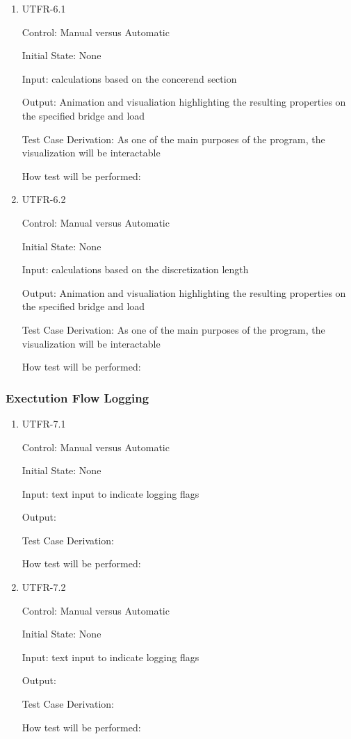 \documentclass[12pt, titlepage]{article}
\begin{document}
\begin{enumerate}

\item{UTFR-6.1\\}

Control: Manual versus Automatic
					
Initial State: None
					
Input: calculations based on the concerend section 
					
Output: Animation and visualiation highlighting the resulting properties on the specified bridge and load 

Test Case Derivation: As one of the main purposes of the program, the visualization will be interactable 

How test will be performed: 
					
\item{UTFR-6.2\\}

Control: Manual versus Automatic
					
Initial State: None
					
Input: calculations based on the discretization length 
					
Output:  Animation and visualiation highlighting the resulting properties on the specified bridge and load 

Test Case Derivation: As one of the main purposes of the program, the visualization will be interactable 

How test will be performed: 

\end{enumerate}

\subsubsection{Exectution Flow Logging}

\begin{enumerate}

\item{UTFR-7.1\\}

Control: Manual versus Automatic
					
Initial State: None
					
Input: text input to indicate logging flags 
					
Output: 

Test Case Derivation: 

How test will be performed: 
					
\item{UTFR-7.2\\}

Control: Manual versus Automatic
					
Initial State: None
					
Input:  text input to indicate logging flags 
					
Output: 

Test Case Derivation: 

How test will be performed: 

\end{enumerate}
\end{document}
